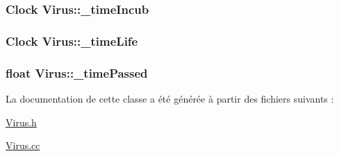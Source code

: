 \label{classVirus_ab9cf8a0bc3ed6a460f2dae403af30b57}
\hypertarget{classVirus_aec1145b5aa1df7d5e2162030cfaaf661}{
\subsubsection[{\_\-timeIncub}]{\setlength{\rightskip}{0pt plus 5cm}Clock {\bf Virus::\_\-timeIncub}}}
\label{classVirus_aec1145b5aa1df7d5e2162030cfaaf661}
\hypertarget{classVirus_ab6e3f2635a1a8335c634a0ad119067ac}{
\subsubsection[{\_\-timeLife}]{\setlength{\rightskip}{0pt plus 5cm}Clock {\bf Virus::\_\-timeLife}}}
\label{classVirus_ab6e3f2635a1a8335c634a0ad119067ac}
\hypertarget{classVirus_a1c57e4cce13902be2418fafc02da10fb}{
\subsubsection[{\_\-timePassed}]{\setlength{\rightskip}{0pt plus 5cm}float {\bf Virus::\_\-timePassed}}}
\label{classVirus_a1c57e4cce13902be2418fafc02da10fb}


La documentation de cette classe a été générée à partir des fichiers suivants :\begin{DoxyCompactItemize}
\item 
\hyperlink{Virus_8h}{Virus.h}\item 
\hyperlink{Virus_8cc}{Virus.cc}\end{DoxyCompactItemize}
